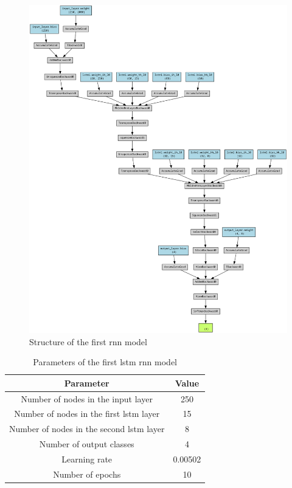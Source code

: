 \begin{figure}[h]
    \centering
    \includegraphics[scale=0.25]{images/rnn_struct.png}
    \caption{Structure of the first \acrshort{rnn} model}
    \label{fig:rnn_struct}
\end{figure}

\begin{table}[h]
    \centering
    \caption{Parameters of the first \acrshort{lstm} \acrshort{rnn} model}
    \label{table:rnn_params}
    \begin{tabular}{|c|c|}
        \hline
        \textbf{Parameter} & \textbf{Value} \\ \hline
        Number of nodes in the input layer & 250 \\ \hline
        Number of nodes in the first \acrshort{lstm} layer & 15 \\ \hline
        Number of nodes in the second \acrshort{lstm} layer & 8 \\ \hline
        Number of output classes & 4 \\ \hline
        Learning rate & 0.00502 \\ \hline
        Number of epochs & 10 \\ \hline
    \end{tabular}
\end{table}


